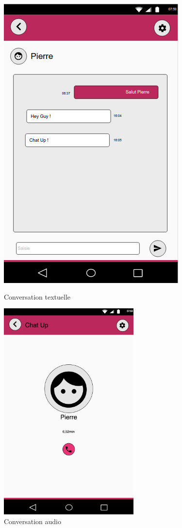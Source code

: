 \begin{figure}[H]
   \begin{minipage}[c]{.46\linewidth}
		\centering \includegraphics[scale=0.5]{img/Conversation.png}
		\caption{Conversation textuelle}
   \end{minipage} \hfill
   \begin{minipage}[c]{.46\linewidth}
		\centering \includegraphics[scale=0.68]{img/audio.png}
		\caption{Conversation audio}
   \end{minipage}
\end{figure}


